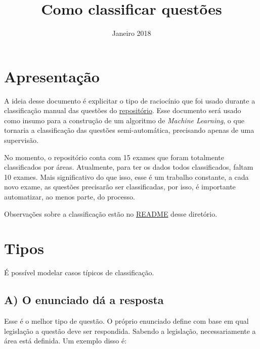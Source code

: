 \documentclass{article}
\title{Como classificar questões}
\date{Janeiro 2018}
\begin{document}
\maketitle

\section*{Apresentação}

A ideia desse documento é explicitar o tipo de raciocínio que foi usado durante a classificação manual das questões do \href{https://github.com/own-pt/oab-exams/tree/master/official/raw}{repositório}. Esse documento será usado como insumo para a construção de um algoritmo de \textit{Machine Learning}, o que tornaria a classificação das questões semi-automática, precisando apenas de uma supervisão.

No momento, o repositório conta com 15 exames que foram totalmente classificados por áreas. Atualmente, para ter os dados todos classificados, faltam 10 exames. Mais significativo do que isso, esse é um trabalho constante, a cada novo exame, as questões precisarão ser classificadas, por isso, é importante automatizar, ao menos parte, do processo.

Observações sobre a classificação estão no  \href{https://github.com/own-pt/oab-exams/blob/master/official/raw/README.org}{ README} desse diretório.

\section*{Tipos}

É possível modelar casos típicos de classificação.

\subsection*{A) O enunciado dá a resposta}

Esse é o melhor tipo de questão. O próprio enunciado define com base em qual legislação a questão deve ser respondida. Sabendo a legislação, necessariamente a área está definida. Um exemplo disso é:
\end{document}
